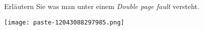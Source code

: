 \documentclass{article}
\begin{document}
\begin{tcolorbox}[colback=white!10!white,colframe=lightgray!75!black,
  savelowerto=\jobname_ex.tex,breakable,enhanced,lines before break=40]

\begin{center}
 Erläutern Sie was man unter einem 
\textit{Double page fault 
}versteht. 

\end{center}

\tcblower

\justifying
\texttt{[image: paste-12043088297985.png]}

\end{tcolorbox}
\end{document}
